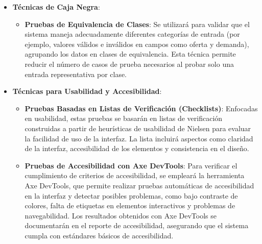 \documentclass[stu, 12pt, letterpaper, donotrepeattitle, floatsintext, natbib]{apa7}
\begin{document}
\begin{itemize}
    \item \textbf{Técnicas de Caja Negra}:
    \begin{itemize}
        \item \textbf{Pruebas de Equivalencia de Clases}: Se utilizará para validar que el sistema maneja adecuadamente diferentes categorías de entrada (por ejemplo, valores válidos e inválidos en campos como oferta y demanda), agrupando los datos en clases de equivalencia. Esta técnica permite reducir el número de casos de prueba necesarios al probar solo una entrada representativa por clase.
    \end{itemize}

    \item \textbf{Técnicas para Usabilidad y Accesibilidad}:
    \begin{itemize}
        \item \textbf{Pruebas Basadas en Listas de Verificación (Checklists)}: Enfocadas en usabilidad, estas pruebas se basarán en listas de verificación construidas a partir de heurísticas de usabilidad de Nielsen para evaluar la facilidad de uso de la interfaz. La lista incluirá aspectos como claridad de la interfaz, accesibilidad de los elementos y consistencia en el diseño.
        \item \textbf{Pruebas de Accesibilidad con Axe DevTools}: Para verificar el cumplimiento de criterios de accesibilidad, se empleará la herramienta Axe DevTools, que permite realizar pruebas automáticas de accesibilidad en la interfaz y detectar posibles problemas, como bajo contraste de colores, falta de etiquetas en elementos interactivos y problemas de navegabilidad. Los resultados obtenidos con Axe DevTools se documentarán en el reporte de accesibilidad, asegurando que el sistema cumpla con estándares básicos de accesibilidad.
    \end{itemize}
\end{itemize}
\end{document}
